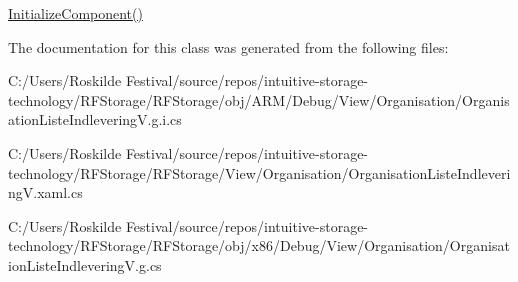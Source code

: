 \mbox{\hyperlink{class_r_f_storage_1_1_view_1_1_organisation_1_1_organisation_liste_indlevering_v_a4faf281a2fce600af22aea17b58238e2}{Initialize\+Component()}} 



The documentation for this class was generated from the following files\+:\begin{DoxyCompactItemize}
\item 
C\+:/\+Users/\+Roskilde Festival/source/repos/intuitive-\/storage-\/technology/\+R\+F\+Storage/\+R\+F\+Storage/obj/\+A\+R\+M/\+Debug/\+View/\+Organisation/Organisation\+Liste\+Indlevering\+V.\+g.\+i.\+cs\item 
C\+:/\+Users/\+Roskilde Festival/source/repos/intuitive-\/storage-\/technology/\+R\+F\+Storage/\+R\+F\+Storage/\+View/\+Organisation/Organisation\+Liste\+Indlevering\+V.\+xaml.\+cs\item 
C\+:/\+Users/\+Roskilde Festival/source/repos/intuitive-\/storage-\/technology/\+R\+F\+Storage/\+R\+F\+Storage/obj/x86/\+Debug/\+View/\+Organisation/Organisation\+Liste\+Indlevering\+V.\+g.\+cs\end{DoxyCompactItemize}
